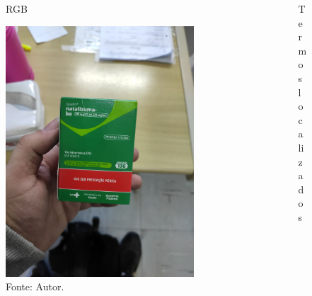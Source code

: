 \begin{frame}
	\begin{columns}
		\begin{column}{0.5\textwidth}
			\begin{figure}
				\caption*{RGB}
				\includegraphics[width=0.85\textwidth]{../pictures/tysabri_rgb.jpg}
				\caption*{Fonte: Autor.}
			\end{figure}
		\end{column}
		\begin{column}{0.5\textwidth}
			\begin{figure}
				\caption*{Termos localizados}

\end{figure}
\end{column}
\end{columns}
\end{frame}

